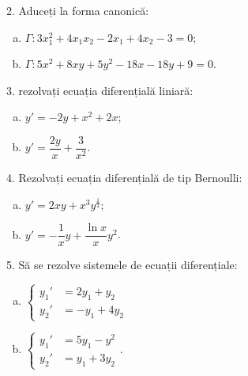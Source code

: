 \vspace{1cm}

2. Aduceți la forma canonică:
\begin{enumerate}[(a)]
  \item $ \Gamma: 3x_1^2 + 4x_1x_2 - 2x_1 + 4x_2 - 3 = 0 $;
  \item $ \Gamma: 5x^2 + 8xy + 5y^2 - 18x - 18y + 9 = 0 $.
\end{enumerate}

\vspace{1cm}

3. rezolvați ecuația diferențială liniară:
\begin{enumerate}[(a)]
  \item $ y' = -2y + x^2 + 2x $;
  \item $ y' = \dfrac{2y}{x} + \dfrac{3}{x^2} $.
\end{enumerate}

\vspace{1cm}

4. Rezolvați ecuația diferențială de tip Bernoulli:
\begin{enumerate}[(a)]
  \item $ y' = 2xy + x^3 y^{\frac{1}{2}} $;
  \item $ y' = -\dfrac{1}{x} y + \dfrac{\ln x}{x} y^2 $.
\end{enumerate}

\vspace{1cm}

5. Să se rezolve sistemele de ecuații diferențiale:
\begin{enumerate}[(a)]
  \item $ \begin{cases}
      y_1' &= 2y_1 + y_2 \\
      y_2' &= -y_1 + 4y_2
    \end{cases} $
  \item $ \begin{cases}
      y_1' &= 5y_1 - y^2 \\
      y_2' &= y_1 + 3y_2
    \end{cases} $.
\end{enumerate}



